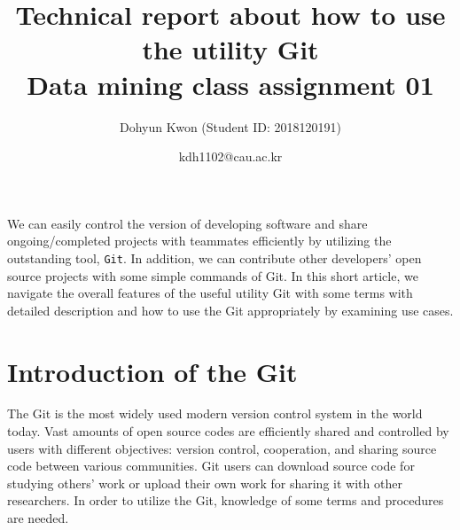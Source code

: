 \documentclass{article}
\begin{document}
\title{Technical report about how to use the utility Git \\ 
       Data mining class assignment 01}

\author[1]{Dohyun Kwon (Student ID: 2018120191)}
\date{kdh1102@cau.ac.kr}
\maketitle
We can easily control the version of developing software and share ongoing/completed projects with teammates efficiently by utilizing the outstanding tool, \texttt{Git}. In addition, we can contribute other developers' open source projects with some simple commands of Git. In this short article, we navigate the overall features of the useful utility Git with some terms with detailed description and how to use the Git appropriately by examining use cases. 

\section{Introduction of the Git}
\hspace*{2mm}The Git is the most widely used modern version control system in the world today. Vast amounts of open source codes are efficiently shared and controlled by users with different objectives: version control, cooperation, and sharing source code between various communities. Git users can download source code for studying others' work or upload their own work for sharing it with other researchers. In order to utilize the Git, knowledge of some terms and procedures are needed.  
\end{document}
